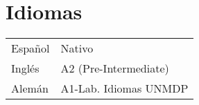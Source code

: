 \documentclass[a4paper,10pt]{article}
\begin{document}
\begin{adjustbox}{valign=t}
\begin{minipage}{0.34\textwidth}
\section*{Idiomas}
\begin{tabular}{ll}
	Español 	&  Nativo \\
	Inglés 		& A2 (Pre-Intermediate)\\
	Alemán      & A1-Lab. Idiomas UNMDP
 \end{tabular}
\end{minipage}
\end{adjustbox}
\hfill
\begin{adjustbox}{valign=t}
\begin{minipage}{0.001\textwidth} %
\MyVerticalRule  %
\end{minipage}
\end{adjustbox}
\hfill
\end{document}
